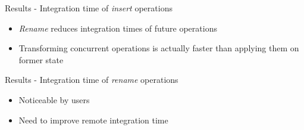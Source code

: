 \begin{frame}{Results - Integration time of \emph{insert} operations}
  \vspace{-1\baselineskip}
  \begin{itemize}
    \item<2-> \emph{Rename} reduces integration times of future operations
    \item<3> Transforming concurrent operations is actually faster than applying them on former state
  \end{itemize}

\end{frame}

\begin{frame}{Results - Integration time of \emph{rename} operations}
  \begin{table}[!ht]
      \centering
      \caption{Integration time of rename operations}
  \end{table}

  \begin{itemize}
    \item<2-> Noticeable by users
    \item<3> Need to improve remote integration time
  \end{itemize}
\end{frame}

